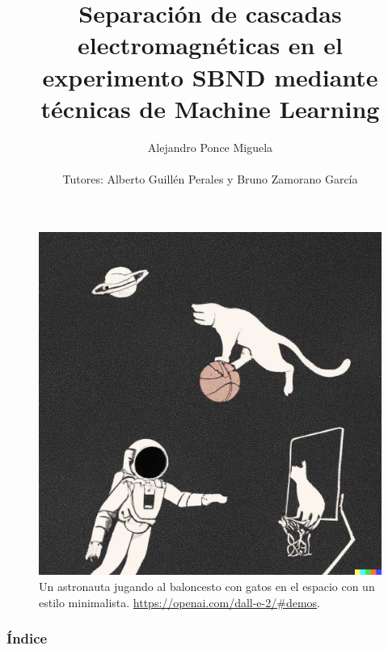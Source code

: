 \documentclass{beamer}
\title[Trabajo de fin de master]{Separación de cascadas electromagnéticas en el experimento SBND mediante técnicas de Machine Learning}
\subtitle[]{}
\author[Alejandro P. M.]{Alejandro Ponce Miguela\\
$~$\\
Tutores: Alberto Guillén Perales y Bruno Zamorano García}
\institute[Univ. de Granada]{Universidad de Granada}
\date{}
\begin{document}
\frame{\titlepage}
\begin{frame}
  \begin{figure}[h!]
    \centering
        \includegraphics[scale=0.19]{dalle.jpg} 
        \caption{Un astronauta jugando al baloncesto con gatos en el espacio con un estilo minimalista. \url{https://openai.com/dall-e-2/\#demos}.}
\end{figure}

\end{frame}

\begin{frame}
  \frametitle{Índice}
  \tableofcontents
\end{frame}
\end{document}
